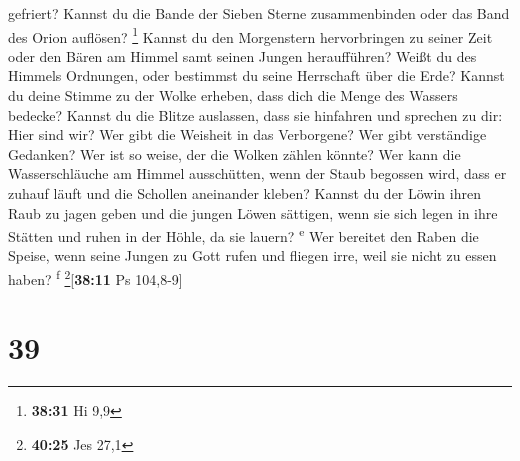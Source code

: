 gefriert?  Kannst du die Bande der Sieben Sterne
zusammenbinden oder das Band des Orion auflösen? \footnote{\textbf{38:31}
  Hi 9,9}  Kannst du den Morgenstern hervorbringen zu
seiner Zeit oder den Bären am Himmel samt seinen Jungen heraufführen?
 Weißt du des Himmels Ordnungen, oder bestimmst du seine
Herrschaft über die Erde?  Kannst du deine Stimme zu der
Wolke erheben, dass dich die Menge des Wassers bedecke? 
Kannst du die Blitze auslassen, dass sie hinfahren und sprechen zu dir:
Hier sind wir?  Wer gibt die Weisheit in das Verborgene?
Wer gibt verständige Gedanken?  Wer ist so weise, der die
Wolken zählen könnte? Wer kann die Wasserschläuche am Himmel
ausschütten,  wenn der Staub begossen wird, dass er
zuhauf läuft und die Schollen aneinander kleben?  Kannst
du der Löwin ihren Raub zu jagen geben und die jungen Löwen sättigen,
 wenn sie sich legen in ihre Stätten und ruhen in der
Höhle, da sie lauern? \textsuperscript{e}  Wer bereitet
den Raben die Speise, wenn seine Jungen zu Gott rufen und fliegen irre,
weil sie nicht zu essen haben? \textsuperscript{f}
\footnote{\textbf{40:25} Jes 27,1}{[}\textbf{38:11} Ps 104,8-9{]}

\hypertarget{section-38}{%
\section{39}\label{section-38}}

